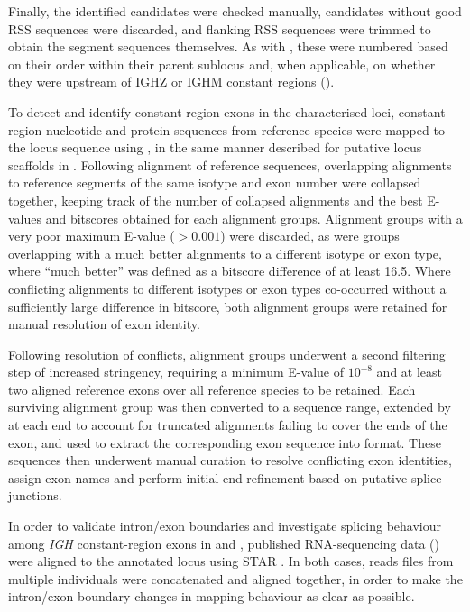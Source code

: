 Finally, the identified \dh candidates were checked manually, candidates without good RSS sequences were discarded, and flanking RSS sequences were trimmed to obtain the \dh segment sequences themselves. As with \jh, these were numbered based on their order within their parent sublocus and, when applicable, on whether they were upstream of IGHZ or IGHM constant regions ().


\noindent To detect and identify constant-region exons in the characterised loci, constant-region nucleotide and protein sequences from reference species were mapped to the locus sequence using  \parencite{altschul1990blast,altschul1997blast}, in the same manner described for putative locus scaffolds in .
Following alignment of reference sequences, overlapping alignments to reference segments of the same isotype and exon number were collapsed together, keeping track of the number of collapsed alignments and the best E-values and bitscores obtained for each alignment groups. Alignment groups with a very poor maximum E-value ($> 0.001$) were discarded, as were groups overlapping with a much better alignments to a different isotype or exon type, where ``much better'' was defined as a bitscore difference of at least 16.5. Where conflicting alignments to different isotypes or exon types co-occurred without a sufficiently large difference in bitscore, both alignment groups were retained for manual resolution of exon identity.

Following resolution of conflicts, alignment groups underwent a second filtering step of increased stringency, requiring a minimum E-value of $10^{-8}$ and at least two aligned reference exons over all reference species to be retained. Each surviving alignment group was then converted to a sequence range, extended by  at each end to account for truncated alignments failing to cover the ends of the exon, and used to extract the corresponding exon sequence into  format. These sequences then underwent manual curation to resolve conflicting exon identities, assign exon names and perform initial end refinement based on putative splice junctions.

In order to validate intron/exon boundaries and investigate splicing behaviour among \textit{IGH} constant-region exons in \Nfu and \Xma, published RNA-sequencing data () were aligned to the annotated locus using STAR \parencite{dobin2013star}. In both cases, reads files from multiple individuals were concatenated and aligned together, in order to make the intron/exon boundary changes in mapping behaviour as clear as possible. 

